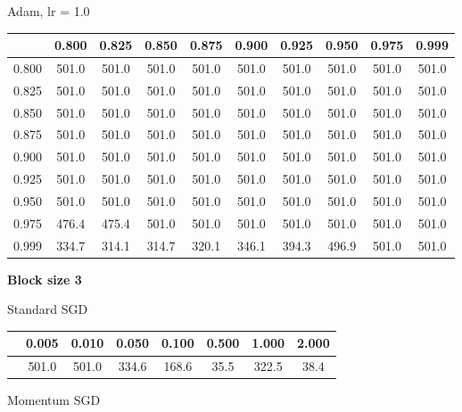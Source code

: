 \documentclass[a4paper,14pt,oneside,openany]{memoir}
\begin{document}
	Adam, lr = 1.0 
	
	\begin{tabular}{|c|c|c|c|c|c|c|c|c|c|}
	\hline 
	 &0.800 &0.825 &0.850 &0.875 &0.900 &0.925 &0.950 &0.975 &0.999 \\
	 \hline 
	0.800 &501.0 &501.0 &501.0 &501.0 &501.0 &501.0 &501.0 &501.0 &501.0 \\
	 \hline 
	0.825 &501.0 &501.0 &501.0 &501.0 &501.0 &501.0 &501.0 &501.0 &501.0 \\
	 \hline 
	0.850 &501.0 &501.0 &501.0 &501.0 &501.0 &501.0 &501.0 &501.0 &501.0 \\
	 \hline 
	0.875 &501.0 &501.0 &501.0 &501.0 &501.0 &501.0 &501.0 &501.0 &501.0 \\
	 \hline 
	0.900 &501.0 &501.0 &501.0 &501.0 &501.0 &501.0 &501.0 &501.0 &501.0 \\
	 \hline 
	0.925 &501.0 &501.0 &501.0 &501.0 &501.0 &501.0 &501.0 &501.0 &501.0 \\
	 \hline 
	0.950 &501.0 &501.0 &501.0 &501.0 &501.0 &501.0 &501.0 &501.0 &501.0 \\
	 \hline 
	0.975 &476.4 &475.4 &501.0 &501.0 &501.0 &501.0 &501.0 &501.0 &501.0 \\
	 \hline 
	0.999 &334.7 &314.1 &314.7 &320.1 &346.1 &394.3 &496.9 &501.0 &501.0 \\
	 \hline 
	
	\end{tabular}
	
	\textbf{Block size 3}
	
	Standard SGD 
	
	\begin{tabular}{|c|c|c|c|c|c|c|c|}
	\hline 
	 &0.005 &0.010 &0.050 &0.100 &0.500 &1.000 &2.000 \\
	 \hline 
	 &501.0 &501.0 &334.6 &168.6 &35.5 &322.5 &38.4 \\
	 \hline 
	
	\end{tabular}
	
	Momentum SGD 
	
\end{document}
